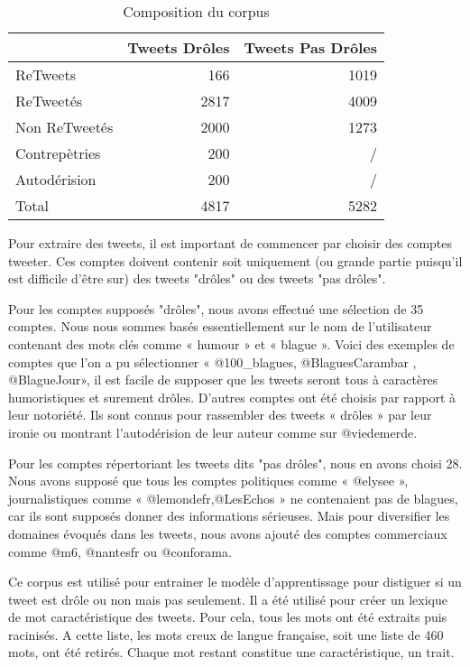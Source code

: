\documentclass[10pt,a4paper,twoside]{article}
\begin{document}
\begin{table}[!h]
\centering
	\begin{tabular}{lrr}
	\toprule
	& Tweets Drôles & Tweets Pas Drôles \\
	\midrule
	 ReTweets & 166 & 1019 \\
	
	 ReTweetés & 2817 & 4009 \\
	
	Non ReTweetés & 2000 & 1273 \\
	
	Contrepètries & 200 & / \\
	Autodérision & 200 & / \\
	 \midrule
	Total & 4817 & 5282 \\
	\bottomrule
	\end{tabular}
\caption{Composition du corpus}
\end{table}


Pour extraire des tweets, il est important de commencer par choisir des comptes tweeter. Ces comptes doivent contenir soit uniquement (ou grande partie puisqu'il est difficile d'être sur) des tweets "drôles" ou des tweets "pas drôles".

Pour les comptes supposés "drôles", nous avons effectué une sélection de 35 comptes. Nous nous sommes basés essentiellement sur le nom de l'utilisateur contenant des mots clés comme « humour » et « blague ». Voici des exemples de comptes que l'on a pu sélectionner « @100\_blagues, @BlaguesCarambar , @BlagueJour», il est facile de supposer que les tweets seront tous à caractères humoristiques et surement drôles. D'autres comptes ont été choisis par rapport à leur notoriété. Ils sont connus pour rassembler des tweets « drôles » par leur ironie ou montrant l'autodérision de leur auteur comme sur @viedemerde.

Pour les comptes répertoriant les tweets dits "pas drôles", nous en avons choisi 28. Nous avons supposé que tous les comptes politiques comme « @elysee », journalistiques comme « @lemondefr,@LesEchos » ne contenaient pas de blagues, car ils sont supposés donner des informations sérieuses. Mais pour diversifier les domaines évoqués dans les tweets, nous avons ajouté des comptes commerciaux comme @m6, @nantesfr ou @conforama.

Ce corpus est utilisé pour entrainer le modèle d'apprentissage pour distiguer si un tweet est drôle ou non mais pas seulement. Il a été utilisé pour créer un lexique de mot caractéristique des tweets. Pour cela, tous les mots ont été extraits puis racinisés. A cette liste, les mots creux de langue française, soit une liste de 460 mots, ont été retirés. Chaque mot restant constitue une caractéristique, un trait.
\end{document}
